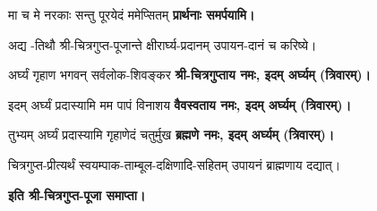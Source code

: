 \begin{center}

{मा च मे नरकाः सन्तु पूरयेदं ममेप्सितम्}
\textbf{प्रार्थनाः समर्पयामि।}
\medskip

\end{center}

अद्य \blank{}-तिथौ श्री-चित्रगुप्त-पूजान्ते क्षीरार्घ्य-प्रदानम् उपायन-दानं च करिष्ये।
\begin{center}

{अर्घ्यं गृहाण भगवन् सर्वलोक-शिवङ्कर}
\textbf{श्री-चित्रगुप्ताय नमः, इदम् अर्घ्यम् (त्रिवारम्)।}
\medskip

{इदम् अर्घ्यं प्रदास्यामि मम पापं विनाशय}
\textbf{वैवस्वताय नमः, इदम् अर्घ्यम् (त्रिवारम्)।}
\medskip

{तुभ्यम् अर्घ्यं प्रदास्यामि गृहाणेदं चतुर्मुख}
\textbf{ब्रह्मणे नमः, इदम् अर्घ्यम् (त्रिवारम्)।}
\medskip

\end{center}

चित्रगुप्त-प्रीत्यर्थं स्वयम्पाक-ताम्बूल-दक्षिणादि-सहितम् उपायनं ब्राह्मणाय दद्यात्।

\bigskip
\begin{center}
\textbf{इति श्री-चित्रगुप्त-पूजा समाप्ता।}
\end{center}

\closesection
